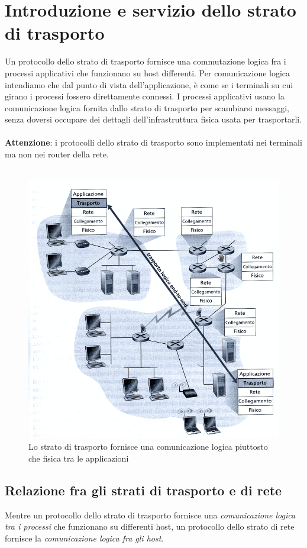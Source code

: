 \documentclass[11pt,a4paper]{book}
\begin{document}
\section{Introduzione e servizio dello strato di trasporto}
Un protocollo dello strato di trasporto fornisce una commutazione logica fra i processi applicativi che funzionano su host differenti. Per comunicazione logica intendiamo che dal punto di vista dell'applicazione, è come se i terminali su cui girano i processi fossero direttamente connessi. I processi applicativi usano la comunicazione logica fornita dallo strato di trasporto per scambiarsi messaggi, senza doversi occupare dei dettagli dell'infrastruttura fisica usata per trasportarli.\\ \\
\textbf{Attenzione}: i protocolli dello strato di trasporto sono implementati nei terminali ma non nei router della rete. \\ \\
\begin{figure}
	\includegraphics[scale=0.6]{img/009.png}
	\caption{Lo strato di trasporto fornisce una comunicazione logica piuttosto che fisica tra le applicazioni}
\end{figure}
\subsection{Relazione fra gli strati di trasporto e di rete}
Mentre un protocollo dello strato di trasporto fornisce una \emph{comunicazione logica tra i processi} che funzionano su differenti host, un protocollo dello strato di rete fornisce la \emph{comunicazione logica fra gli host}.
\end{document}
